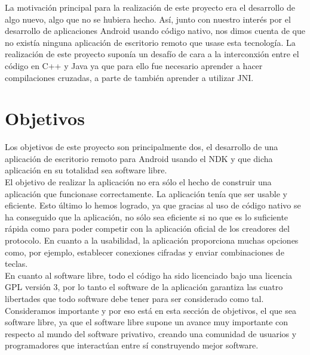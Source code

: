 La motivación principal para la realización de este proyecto era el desarrollo de algo nuevo, algo que no se hubiera hecho. Así, junto con nuestro interés por el desarrollo de aplicaciones Android usando código nativo, nos dimos cuenta de que no existía ninguna aplicación de escritorio remoto que usase esta tecnología. La realización de este proyecto suponía un desafío de cara a la interconxión entre el código en C++ y Java ya que para ello fue necesario aprender a hacer compilaciones cruzadas, a parte de también aprender a utilizar JNI.

\section{Objetivos}

Los objetivos de este proyecto son principalmente dos, el desarrollo de una aplicación de escritorio remoto para Android usando el NDK y que dicha aplicación en su totalidad sea software libre.\\

El objetivo de realizar la aplicación no era sólo el hecho de construir una aplicación que funcionase correctamente. La aplicación tenía que ser usable y eficiente. Esto último lo hemos logrado, ya que gracias al uso de código nativo se ha conseguido que la aplicación, no sólo sea eficiente si no que es lo suficiente rápida como para poder competir con la aplicación oficial de los creadores del protocolo. En cuanto a la usabilidad, la aplicación proporciona muchas opciones como, por ejemplo, establecer conexiones cifradas y enviar combinaciones de teclas.\\

En cuanto al software libre, todo el código ha sido licenciado bajo una licencia GPL versión 3, por lo tanto el software de la aplicación garantiza las cuatro libertades que todo software debe tener para ser considerado como tal.\\

Consideramos importante y por eso está en esta sección de objetivos, el que sea software libre, ya que el software libre supone un avance muy importante con respecto al mundo del software privativo, creando una comunidad de usuarios y programadores que interactúan entre sí construyendo mejor software. 
